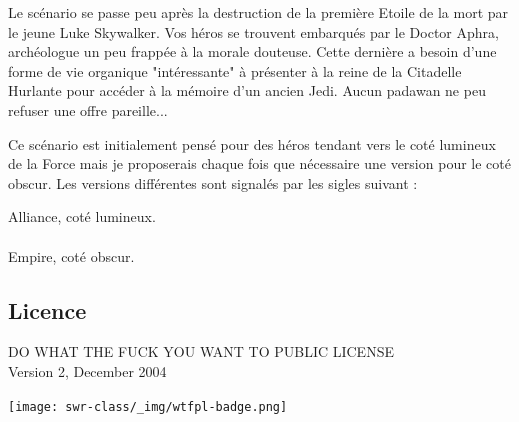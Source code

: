 \documentclass{jdrp}
\begin{document}
    Le scénario se passe peu après la destruction de la première Etoile de la mort par le jeune Luke Skywalker. Vos héros se trouvent embarqués par le Doctor Aphra, archéologue un peu frappée à la morale douteuse. Cette dernière a besoin d’une forme de vie organique "intéressante" à présenter à la reine de la Citadelle Hurlante pour accéder à la mémoire d’un ancien Jedi. Aucun padawan ne peu refuser une offre pareille...

    \bigbreak

    Ce scénario est initialement pensé pour des héros tendant vers le coté lumineux de la Force mais je proposerais chaque fois que nécessaire une version pour le coté obscur. Les versions différentes sont signalés par les sigles suivant :

    \lettrine{\jedifont{\$}} Alliance, coté lumineux. 
    \\ \\ 
    \lettrine{\jedifont{\#}} Empire, coté obscur.
    \vspace*{\fill}

	\subsection{Licence}
	\noindent DO WHAT THE FUCK YOU WANT TO PUBLIC LICENSE\\
    Version 2, December 2004
    \vspace{-2.5\baselineskip}
	\begin{flushright}
		\texttt{[image: swr-class/\_img/wtfpl-badge.png]}
	\end{flushright}

	\twocolumn

	
    
    
    
	
	

	\onecolumn
	\nocite{*}
	\printbibliography
\end{document}
